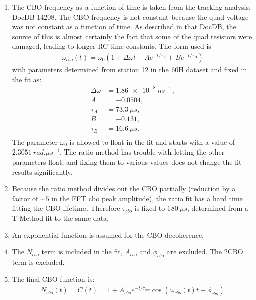 \begin{enumerate}
	\item{The CBO frequency as a function of time is taken from the tracking analysis, DocDB 14208. The CBO frequency is not constant because the quad voltage was not constant as a function of time. As described in that DocDB, the source of this is almost certainly the fact that some of the quad resistors were damaged, leading to longer RC time constants. The form used is 
		\begin{gather}
			\omega_{cbo}(t) = \omega_{0}(1 + \Delta\omega t + A e^{-t/\tau_{A}} + B e^{-t/\tau_{B}})
		\end{gather}
	with parameters determined from station 12 in the 60H dataset and fixed in the fit as:
		\begin{equation*}	
		\begin{aligned}
		 	\Delta\omega &= \SI{1.86e-8}{ns^{-1}}, \\
		 	A &= -0.0504, \\
		 	\tau_{A} &= \SI{73.3}{\mu s}, \\
		 	B &= -0.131, \\
		 	\tau_{B} &= \SI{16.6}{\mu s}. \\
		\end{aligned}
		\end{equation*}
	The parameter $\omega_{0}$ is allowed to float in the fit and starts with a value of $\SI{2.3051}{rad.\mu s^{-1}}$. The ratio method has trouble with letting the other parameters float, and fixing them to various values does not change the fit results significantly.}
	\item{Because the ratio method divides out the CBO partially (reduction by a factor of $\sim5$ in the FFT cbo peak amplitude), the ratio fit has a hard time fitting the CBO lifetime. Therefore $\tau_{cbo}$ is fixed to $\SI{180}{\mu s}$, determined from a T Method fit to the same data.}
	\item{An exponential function is assumed for the CBO decoherence.}
	\item{The $N_{cbo}$ term is included in the fit, $A_{cbo}$ and $\phi_{cbo}$ are excluded. The 2CBO term is excluded.}
	\item{The final CBO function is:
		\begin{gather}
				N_{cbo}(t) = C(t) = 1 + A_{cbo} e^{-t/\tau_{cbo}} \cos(\omega_{cbo}(t)t + \phi_{cbo})
		\label{eqn:CBO}
		\end{gather}
	}
\end{enumerate}


